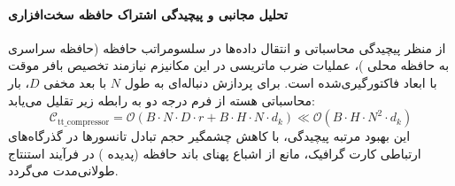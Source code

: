 \paragraph{تحلیل مجانبی و پیچیدگی اشتراک حافظه سخت‌افزاری}
از منظر پیچیدگی محاسباتی و انتقال داده‌ها در سلسومراتب حافظه (حافظه سراسری  به حافظه محلی )، عملیات ضرب ماتریسی در این مکانیزم نیازمند تخصیص بافر موقت با ابعاد فاکتورگیری‌شده است. برای پردازش دنباله‌ای به طول $N$ با بعد مخفی $D$، بار محاسباتی هسته از فرم درجه دو به رابطه زیر تقلیل می‌یابد:
\begin{equation}
\label{eq:complexity_tt_compressor}
\mathcal{C}_{\text{tt\_compressor}} = \mathcal{O}\left( B \cdot N \cdot D \cdot r + B \cdot H \cdot N \cdot d_k \right) \ll \mathcal{O}\left( B \cdot H \cdot N^2 \cdot d_k \right)
\end{equation}
این بهبود مرتبه پیچیدگی، با کاهش چشمگیر حجم تبادل تانسورها در گذرگاه‌های ارتباطی کارت گرافیک، مانع از اشباع پهنای باند حافظه (پدیده ) در فرآیند استنتاج طولانی‌مدت می‌گردد.
